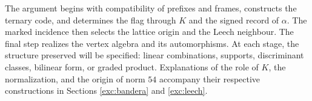 The argument begins with compatibility of prefixes and frames,
constructs the ternary code, and determines the flag through \(K\) and the
signed record of \(\alpha\). The marked incidence then selects
the lattice origin and the Leech neighbour. The final step realizes the vertex
algebra and its automorphisms. At each stage, the structure preserved will be specified:
linear combinations, supports, discriminant classes, bilinear
form, or graded product. Explanations of the role of \(K\),
the normalization, and the origin of norm \(54\) accompany their respective
constructions in Sections \ref{exc:bandera} and \ref{exc:leech}.
